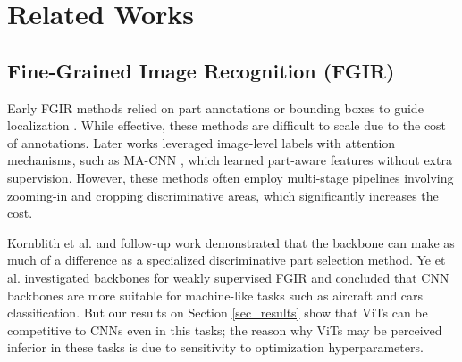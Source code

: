 \documentclass[10pt,twocolumn,letterpaper]{article}
\begin{document}
\section{Related Works}
\label{sec_related}
\subsection{Fine-Grained Image Recognition (FGIR)}
Early FGIR methods relied on part annotations or bounding boxes to guide localization \cite{zhang_part-based_2014}. While effective, these methods are difficult to scale due to the cost of annotations. Later works leveraged image-level labels with attention mechanisms, such as MA-CNN \cite{zheng_learning_2017}, which learned part-aware features without extra supervision. However, these methods often employ multi-stage pipelines involving zooming-in and cropping discriminative areas, which significantly increases the cost.

Kornblith et al. \cite{kornblith_better_2019} and follow-up work \cite{goldblum_battle_2023, jeevan_which_2025} demonstrated that the backbone can make as much of a difference as a specialized discriminative part selection method. Ye et al. \cite{ye_image_2024} investigated backbones for weakly supervised FGIR and concluded that CNN backbones are more suitable for machine-like tasks such as aircraft and cars classification. But our results on Section \ref{sec_results} show that ViTs can be competitive to CNNs even in this tasks; the reason why ViTs may be perceived inferior in these tasks is due to sensitivity to optimization hyperparameters.


\end{document}
